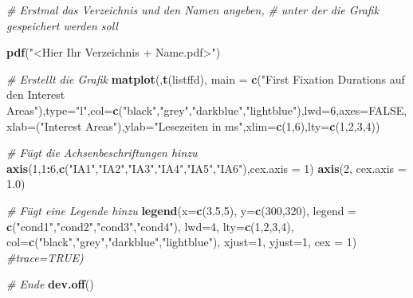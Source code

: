 \documentclass[]{book}
\newenvironment{Shaded}{\begin{snugshade}}{\end{snugshade}}
\newcommand{\KeywordTok}[1]{\textcolor[rgb]{0.13,0.29,0.53}{\textbf{#1}}}
\newcommand{\DataTypeTok}[1]{\textcolor[rgb]{0.13,0.29,0.53}{#1}}
\newcommand{\DecValTok}[1]{\textcolor[rgb]{0.00,0.00,0.81}{#1}}
\newcommand{\FloatTok}[1]{\textcolor[rgb]{0.00,0.00,0.81}{#1}}
\newcommand{\StringTok}[1]{\textcolor[rgb]{0.31,0.60,0.02}{#1}}
\newcommand{\CommentTok}[1]{\textcolor[rgb]{0.56,0.35,0.01}{\textit{#1}}}
\newcommand{\OtherTok}[1]{\textcolor[rgb]{0.56,0.35,0.01}{#1}}
\newcommand{\OperatorTok}[1]{\textcolor[rgb]{0.81,0.36,0.00}{\textbf{#1}}}
\newcommand{\NormalTok}[1]{#1}
\begin{document}
\begin{Shaded}
\begin{Highlighting}[]
\CommentTok{# Erstmal das Verzeichnis und den Namen angeben,}
\CommentTok{# unter der die Grafik gespeichert werden soll}

\KeywordTok{pdf}\NormalTok{(}\StringTok{"<Hier Ihr Verzeichnis + Name.pdf>"}\NormalTok{)}

\CommentTok{# Erstellt die Grafik}
\KeywordTok{matplot}\NormalTok{(,}\KeywordTok{t}\NormalTok{(listffd), }\DataTypeTok{main =} \KeywordTok{c}\NormalTok{(}\StringTok{"First Fixation Durations auf den Interest Areas"}\NormalTok{),}\DataTypeTok{type=}\StringTok{"l"}\NormalTok{,}\DataTypeTok{col=}\KeywordTok{c}\NormalTok{(}\StringTok{"black"}\NormalTok{,}\StringTok{"grey"}\NormalTok{,}\StringTok{"darkblue"}\NormalTok{,}\StringTok{"lightblue"}\NormalTok{),}\DataTypeTok{lwd=}\DecValTok{6}\NormalTok{,}\DataTypeTok{axes=}\OtherTok{FALSE}\NormalTok{,}\DataTypeTok{xlab=}\NormalTok{(}\StringTok{"Interest Areas"}\NormalTok{),}\DataTypeTok{ylab=}\StringTok{"Lesezeiten in ms"}\NormalTok{,}\DataTypeTok{xlim=}\KeywordTok{c}\NormalTok{(}\DecValTok{1}\NormalTok{,}\DecValTok{6}\NormalTok{),}\DataTypeTok{lty=}\KeywordTok{c}\NormalTok{(}\DecValTok{1}\NormalTok{,}\DecValTok{2}\NormalTok{,}\DecValTok{3}\NormalTok{,}\DecValTok{4}\NormalTok{))}

\CommentTok{# Fügt die Achsenbeschriftungen hinzu}
\KeywordTok{axis}\NormalTok{(}\DecValTok{1}\NormalTok{,}\DecValTok{1}\OperatorTok{:}\DecValTok{6}\NormalTok{,}\KeywordTok{c}\NormalTok{(}\StringTok{"IA1"}\NormalTok{,}\StringTok{"IA2"}\NormalTok{,}\StringTok{"IA3"}\NormalTok{,}\StringTok{"IA4"}\NormalTok{,}\StringTok{"IA5"}\NormalTok{,}\StringTok{"IA6"}\NormalTok{),}\DataTypeTok{cex.axis =} \DecValTok{1}\NormalTok{)}
\KeywordTok{axis}\NormalTok{(}\DecValTok{2}\NormalTok{, }\DataTypeTok{cex.axis =} \FloatTok{1.0}\NormalTok{)}

\CommentTok{# Fügt eine Legende hinzu}
\KeywordTok{legend}\NormalTok{(}\DataTypeTok{x=}\KeywordTok{c}\NormalTok{(}\FloatTok{3.5}\NormalTok{,}\DecValTok{5}\NormalTok{),}
       \DataTypeTok{y=}\KeywordTok{c}\NormalTok{(}\DecValTok{300}\NormalTok{,}\DecValTok{320}\NormalTok{),}
       \DataTypeTok{legend =} \KeywordTok{c}\NormalTok{(}\StringTok{"cond1"}\NormalTok{,}\StringTok{"cond2"}\NormalTok{,}\StringTok{"cond3"}\NormalTok{,}\StringTok{"cond4"}\NormalTok{),}
       \DataTypeTok{lwd=}\DecValTok{4}\NormalTok{,}
       \DataTypeTok{lty=}\KeywordTok{c}\NormalTok{(}\DecValTok{1}\NormalTok{,}\DecValTok{2}\NormalTok{,}\DecValTok{3}\NormalTok{,}\DecValTok{4}\NormalTok{),}
       \DataTypeTok{col=}\KeywordTok{c}\NormalTok{(}\StringTok{"black"}\NormalTok{,}\StringTok{"grey"}\NormalTok{,}\StringTok{"darkblue"}\NormalTok{,}\StringTok{"lightblue"}\NormalTok{),}
       \DataTypeTok{xjust=}\DecValTok{1}\NormalTok{,}
       \DataTypeTok{yjust=}\DecValTok{1}\NormalTok{,}
       \DataTypeTok{cex =} \DecValTok{1}\NormalTok{)}
\CommentTok{#trace=TRUE)}

\CommentTok{# Ende}
\KeywordTok{dev.off}\NormalTok{()}
\end{Highlighting}
\end{Shaded}
\end{document}
